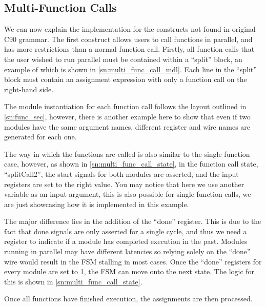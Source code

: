\subsection{Multi-Function Calls}

We can now explain the implementation for the constructs not found in original C90 grammar. The first construct allows users to call functions in parallel, and has more restrictions than a normal function call. Firstly, all function calls that the user wished to run parallel must be contained within a “split” block, an example of which is shown in \autoref{sn:multi_func_call_mdl}. Each line in the “split” block must contain an assignment expression with only a function call on the right-hand side.

The module instantiation for each function call follows the layout outlined in \autoref{sn:func_sec}, however, there is another example here to show that even if two modules have the same argument names, different register and wire names are generated for each one.

The way in which the functions are called is also similar to the single function case, however, as shown in \autoref{sn:multi_func_call_state}, in the function call state, “splitCall2”, the start signals for both modules are asserted, and the input registers are set to the right value. You may notice that here we use another variable as an input argument, this is also possible for single function calls, we are just showcasing how it is implemented in this example. 

The major difference lies in the addition of the “done” register. This is due to the fact that done signals are only asserted for a single cycle, and thus we need a register to indicate if a module has completed execution in the past. Modules running in parallel may have different latencies so relying solely on the “done” wire would result in the FSM stalling in most cases. Once the “done” registers for every module are set to 1, the FSM can move onto the next state. The logic for this is shown in \autoref{sn:multi_func_call_state}.

Once all functions have finished execution, the assignments are then processed.

